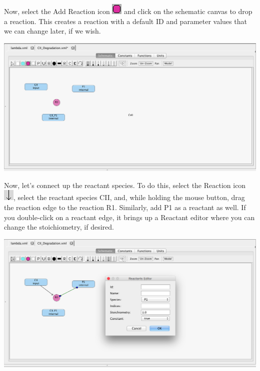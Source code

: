 \documentclass[titlepage,11pt]{article}
\begin{document}
Now, select the Add Reaction icon \includegraphics{../gui/icons/modelview/add_reaction_selected} and click on the schematic canvas to drop a reaction.  This creates a reaction with a default ID and parameter values that we can change later, if we wish.

\begin{center}
\includegraphics[width=160mm]{screenshots/reaction}
\end{center}

Now, let's connect up the reactant species.  To do this, select the Reaction icon \includegraphics{../gui/icons/modelview/reaction_selected}, select the reactant species CII, and, while holding the mouse button, drag the reaction edge to the reaction R1.  Similarly, add P1 as a reactant as well.  If you double-click on a reactant edge, it brings up a Reactant editor where you can change the stoichiometry, if desired.

\begin{center}
\includegraphics[width=160mm]{screenshots/reactant}
\end{center}
\end{document}
